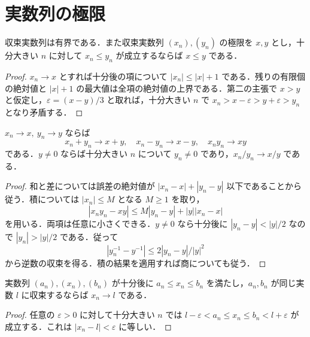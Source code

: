\section{実数列の極限}
\begin{prop}[収束数列の有界性と順序]
収束実数列は有界である．また収束実数列 $(x_n),(y_n)$ の極限を $x,y$ とし，十分大きい $n$ に対して $x_n\leq y_n$ が成立するならば $x\leq y$ である．
\end{prop}
\begin{proof}
$x_n\to x$ とすれば十分後の項について $|x_n|\leq |x|+1$ である．残りの有限個の絶対値と $|x|+1$ の最大値は全項の絶対値の上界である．第二の主張で $x>y$ と仮定し，$\varepsilon=(x-y)/3$ と取れば，十分大きい $n$ で $x_n>x-\varepsilon>y+\varepsilon>y_n$ となり矛盾する．
\end{proof}
\begin{prop}[数列の極限と体演算]
$x_n\to x,\ y_n\to y$ ならば
\[
 x_n+y_n\to x+y,\quad x_n-y_n\to x-y,\quad x_ny_n\to xy
\]
である．$y\ne0$ ならば十分大きい $n$ について $y_n\ne0$ であり，$x_n/y_n\to x/y$ である．
\end{prop}
\begin{proof}
和と差については誤差の絶対値が $|x_n-x|+|y_n-y|$ 以下であることから従う．積については $|x_n|\leq M$ となる $M\geq1$ を取り，
\[
 |x_ny_n-xy|\leq M|y_n-y|+|y||x_n-x|
\]
を用いる．両項は任意に小さくできる．$y\ne0$ なら十分後に $|y_n-y|<|y|/2$ なので $|y_n|>|y|/2$ である．従って
\[
 |y_n^{-1}-y^{-1}|\leq 2|y_n-y|/|y|^2
\]
から逆数の収束を得る．積の結果を適用すれば商についても従う．
\end{proof}
\begin{prop}[挟撃の原理]
実数列 $(a_n),(x_n),(b_n)$ が十分後に $a_n\leq x_n\leq b_n$ を満たし，$a_n,b_n$ が同じ実数 $l$ に収束するならば $x_n\to l$ である．
\end{prop}
\begin{proof}
任意の $\varepsilon>0$ に対して十分大きい $n$ では $l-\varepsilon<a_n\leq x_n\leq b_n<l+\varepsilon$ が成立する．これは $|x_n-l|<\varepsilon$ に等しい．
\end{proof}
